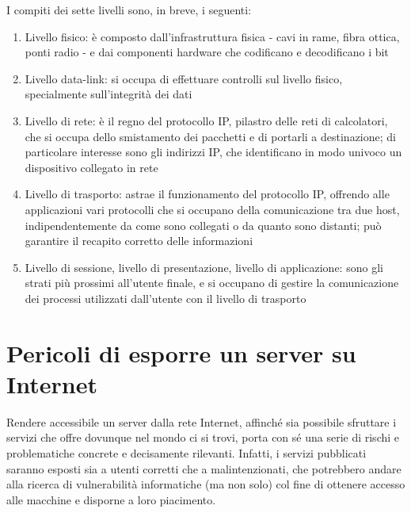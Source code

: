 I compiti dei sette livelli sono, in breve, i seguenti:
\begin{enumerate}
    \item Livello fisico: è composto dall'infrastruttura fisica - cavi in rame, fibra ottica, ponti radio - e dai componenti hardware che codificano e decodificano i bit
    \item Livello data-link: si occupa di effettuare controlli sul livello fisico, specialmente sull'integrità dei dati
    \item Livello di rete: è il regno del protocollo IP, pilastro delle reti di calcolatori, che si occupa dello smistamento dei pacchetti e di portarli a destinazione; di particolare interesse sono gli indirizzi IP, che identificano in modo univoco un dispositivo collegato in rete
    \item Livello di trasporto: astrae il funzionamento del protocollo IP, offrendo alle applicazioni vari protocolli che si occupano della comunicazione tra due host, indipendentemente da come sono collegati o da quanto sono distanti; può garantire il recapito corretto delle informazioni
    \item Livello di sessione, livello di presentazione, livello di applicazione: sono gli strati più prossimi all'utente finale, e si occupano di gestire la comunicazione dei processi utilizzati dall'utente con il livello di trasporto
\end{enumerate}

\section{Pericoli di esporre un server su Internet}
Rendere accessibile un server dalla rete Internet, affinché sia possibile sfruttare i servizi che offre dovunque nel mondo ci si trovi, porta con sé una serie di rischi e problematiche concrete e decisamente rilevanti.
Infatti, i servizi pubblicati saranno esposti sia a utenti corretti che a malintenzionati, che potrebbero andare alla ricerca di vulnerabilità informatiche (ma non solo) col fine di ottenere accesso alle macchine e disporne a loro piacimento.


